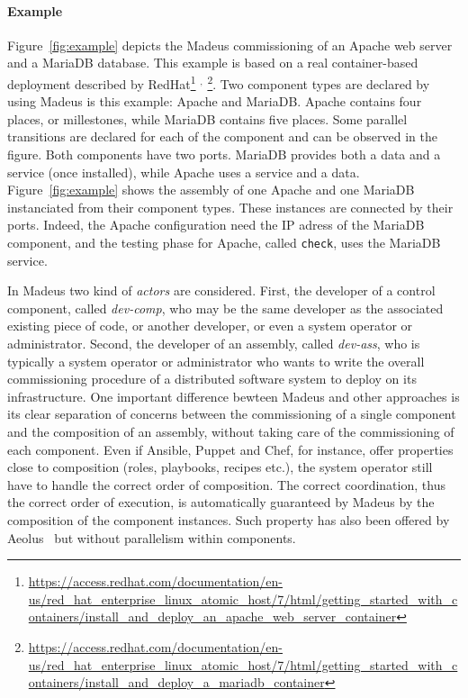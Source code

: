\paragraph{Example}{ Figure~\ref{fig:example} depicts the Madeus
  commissioning of an Apache web server and a MariaDB database. This
  example is based on a real container-based deployment described by
  RedHat\footnote{\url{https://access.redhat.com/documentation/en-us/red_hat_enterprise_linux_atomic_host/7/html/getting_started_with_containers/install_and_deploy_an_apache_web_server_container}}%
  $^,$%
  \footnote{\url{https://access.redhat.com/documentation/en-us/red_hat_enterprise_linux_atomic_host/7/html/getting_started_with_containers/install_and_deploy_a_mariadb_container}}. Two
  component types are declared by using Madeus is this example: Apache
  and MariaDB. Apache contains four places, or millestones, while
  MariaDB contains five places. Some parallel transitions are declared
  for each of the component and can be observed in the figure. Both
  components have two ports. MariaDB provides both a data and a
  service (once installed), while Apache uses a service and a
  data. Figure~\ref{fig:example} shows the assembly of one Apache and
  one MariaDB instanciated from their component types. These instances
  are connected by their ports. Indeed, the Apache configuration need
  the IP adress of the MariaDB component, and the testing phase for
  Apache, called \texttt{check}, uses the MariaDB service.
}

In Madeus two kind of \emph{actors} are considered. First, the
developer of a control component, called \emph{dev-comp}, who may be
the same developer as the associated existing piece of code, or
another developer, or even a system operator or administrator. Second,
the developer of an assembly, called \emph{dev-ass}, who is typically
 a system operator or administrator
who wants to write the overall commissioning procedure of a
distributed software system to deploy on its infrastructure. One
important difference bewteen Madeus and other approaches is its clear
separation of concerns between the commissioning of a single component
and the composition of an assembly, without taking care of the
commissioning of each component. Even if Ansible, Puppet and Chef, for
instance, offer properties close to composition (\eg roles, playbooks,
recipes etc.), the system operator still have to handle the correct
order of composition. The correct coordination, thus the correct order
of execution, is automatically guaranteed by Madeus by the composition
of the component instances. Such property has also been offered by
Aeolus~\cite{} but without parallelism within components.

